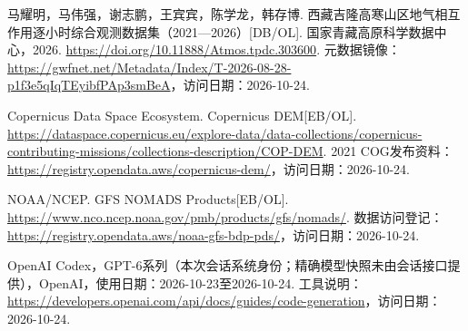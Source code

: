 马耀明，马伟强，谢志鹏，王宾宾，陈学龙，韩存博. 西藏吉隆高寒山区地气相互作用逐小时综合观测数据集（2021—2026）[DB/OL]. 国家青藏高原科学数据中心，2026. \url{https://doi.org/10.11888/Atmos.tpdc.303600}. 元数据镜像：\url{https://gwfnet.net/Metadata/Index/T-2026-08-28-p1f3e5qIqTEyibfPAp3smBeA}，访问日期：2026-10-24.

 Copernicus Data Space Ecosystem. Copernicus DEM[EB/OL]. \url{https://dataspace.copernicus.eu/explore-data/data-collections/copernicus-contributing-missions/collections-description/COP-DEM}. 2021 COG发布资料：\url{https://registry.opendata.aws/copernicus-dem/}，访问日期：2026-10-24.

 NOAA/NCEP. GFS NOMADS Products[EB/OL]. \url{https://www.nco.ncep.noaa.gov/pmb/products/gfs/nomads/}. 数据访问登记：\url{https://registry.opendata.aws/noaa-gfs-bdp-pds/}，访问日期：2026-10-24.

 OpenAI Codex，GPT-6系列（本次会话系统身份；精确模型快照未由会话接口提供），OpenAI，使用日期：2026-10-23至2026-10-24. 工具说明：\url{https://developers.openai.com/api/docs/guides/code-generation}，访问日期：2026-10-24.
